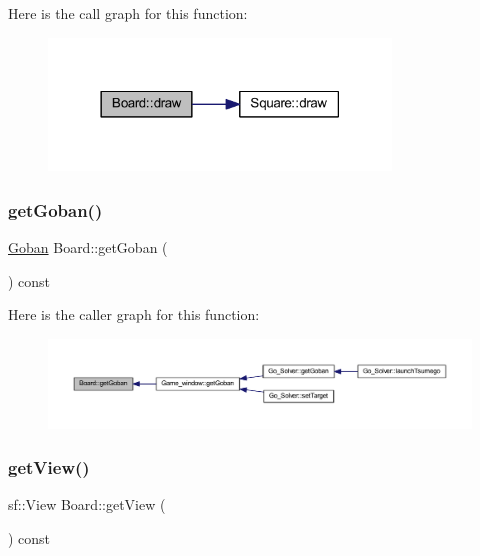 Here is the call graph for this function\+:
\nopagebreak
\begin{figure}[H]
\begin{center}
\leavevmode
\includegraphics[width=258pt]{class_board_a8c86104f9ff30a54cbd7520e006cd609_cgraph}
\end{center}
\end{figure}
\mbox{\label{class_board_a19af96f42f5c38336010da2983abbf5c}} 
\subsubsection{\texorpdfstring{get\+Goban()}{getGoban()}}
{\footnotesize\ttfamily \hyperlink{class_goban}{Goban} Board\+::get\+Goban (\begin{DoxyParamCaption}{ }\end{DoxyParamCaption}) const}

Here is the caller graph for this function\+:
\nopagebreak
\begin{figure}[H]
\begin{center}
\leavevmode
\includegraphics[width=350pt]{class_board_a19af96f42f5c38336010da2983abbf5c_icgraph}
\end{center}
\end{figure}
\mbox{\label{class_board_ad3c413e185668418d3a16c1fec68e70d}} 
\subsubsection{\texorpdfstring{get\+View()}{getView()}}
{\footnotesize\ttfamily sf\+::\+View Board\+::get\+View (\begin{DoxyParamCaption}{ }\end{DoxyParamCaption}) const}

